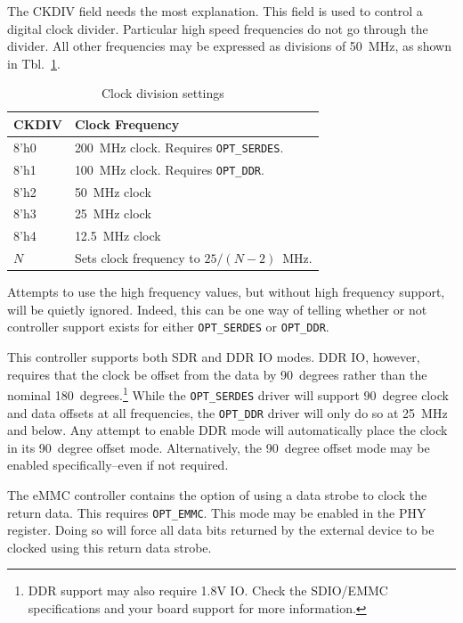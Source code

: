 \documentclass{gqtekspec}
\begin{document}
The CKDIV field needs the most explanation.  This field is used to control
a digital clock divider.  Particular high speed frequencies do not go through
the divider.  All other frequencies may be expressed as divisions of 50~MHz,
as shown in Tbl.~\ref{tbl:CKDIV}.
\begin{table}\begin{center}
\begin{tabular}{|p{1.2in}|p{4.0in}|}\hline
	\rowcolor[gray]{0.85} CKDIV & Clock Frequency\\\hline\hline
8'h0 & 200~MHz clock.  Requires {\tt OPT\_SERDES}.\\
8'h1 & 100~MHz clock.  Requires {\tt OPT\_DDR}.\\
8'h2 &  50~MHz clock\\
8'h3 &  25~MHz clock\\
8'h4 &  12.5~MHz clock\\
$N$ & Sets clock frequency to $25 / \left(N-2\right)$~MHz.
	\\\hline
\end{tabular}
\caption{Clock division settings}\label{tbl:CKDIV}
\end{center}\end{table}
Attempts to use the high frequency values, but without high frequency
support, will be quietly ignored.  Indeed, this can be one way of telling
whether or not controller support exists for either {\tt OPT\_SERDES} or
{\tt OPT\_DDR}.

This controller supports both SDR and DDR IO modes.  DDR IO, however, requires
that the clock be offset from the data by 90~degrees rather than the nominal
180~degrees.\footnote{DDR support may also require 1.8V IO.  Check the SDIO/EMMC
specifications and your board support for more information.}  While the
{\tt OPT\_SERDES} driver will support 90~degree clock and data offsets at all
frequencies, the {\tt OPT\_DDR} driver will only do so at 25~MHz and below.
Any attempt to enable DDR mode will automatically place the clock in its
90~degree offset mode.  Alternatively, the 90~degree offset mode may be
enabled specifically--even if not required.

The eMMC controller contains the option of using a data strobe to clock
the return data.  This requires {\tt OPT\_EMMC}.  This mode may be enabled
in the PHY register.  Doing so will force all data bits returned by the
external device to be clocked using this return data strobe.
\end{document}
